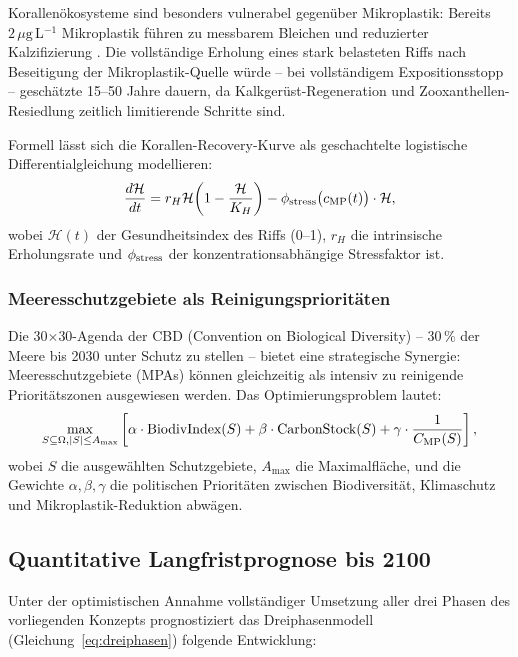 ﻿\documentclass[12pt,a4paper]{article}
\theoremstyle{definition}
\theoremstyle{remark}
\newcommand{\MP}{Mikroplastik}
\begin{document}
Korallen\"okosysteme sind besonders vulnerabel gegen\"uber \MP{}: 
Bereits $2\,\mu\text{g}$\,L$^{-1}$ \MP{} f\"uhren zu messbarem Bleichen
und reduzierter Kalzifizierung \cite{reichert2018plastic}.
Die vollst\"andige Erholung eines stark belasteten Riffs nach Beseitigung
der \MP{}-Quelle w\"urde -- bei vollst\"andigem Expositionsstopp --
gesch\"atzte 15--50 Jahre dauern, da Kalkger\"ust-Regeneration und
Zooxanthellen-Resiedlung zeitlich limitierende Schritte sind.

Formell l\"asst sich die Korallen-Recovery-Kurve als
geschachtelte logistische Differentialgleichung modellieren:
\begin{equation}
  \frac{d\mathcal{H}}{dt} = r_H \mathcal{H}\!\left(1 - \frac{\mathcal{H}}{K_H}\right)
  - \phi_{\rm stress}\bigl(c_{\rm MP}(t)\bigr) \cdot \mathcal{H},
\end{equation}
wobei $\mathcal{H}(t)$ der Gesundheitsindex des Riffs (0--1),
$r_H$ die intrinsische Erholungsrate und $\phi_{\rm stress}$ der
konzentrationsabh\"angige Stressfaktor ist.

\subsubsection{Meeresschutzgebiete als Reinigungsprioritäten}

Die 30$\times$30-Agenda der CBD (Convention on Biological Diversity) --
$30\,\%$ der Meere bis 2030 unter Schutz zu stellen -- bietet eine
strategische Synergie: Meeresschutzgebiete (MPAs) k\"onnen gleichzeitig als
intensiv zu reinigende Prioritätszonen ausgewiesen werden. Das
Optimierungsproblem lautet:
\begin{equation}
  \max_{S \subseteq \Omega, |S| \leq A_{\max}}
  \left[\alpha \cdot \text{BiodivIndex}(S) + \beta \cdot \text{CarbonStock}(S)
  + \gamma \cdot \frac{1}{C_{\rm MP}(S)}\right],
  \label{eq:mpa_optim}
\end{equation}
wobei $S$ die ausgew\"ahlten Schutzgebiete, $A_{\max}$ die Maximalfl\"ache,
und die Gewichte $\alpha, \beta, \gamma$ die politischen Prioritäten
zwischen Biodiversit\"at, Klimaschutz und \MP{}-Reduktion abw\"agen.

\subsection{Quantitative Langfristprognose bis 2100}

Unter der optimistischen Annahme vollst\"andiger Umsetzung aller drei
Phasen des vorliegenden Konzepts prognostiziert das Dreiphasenmodell
(Gleichung~\eqref{eq:dreiphasen}) folgende Entwicklung:
\end{document}
